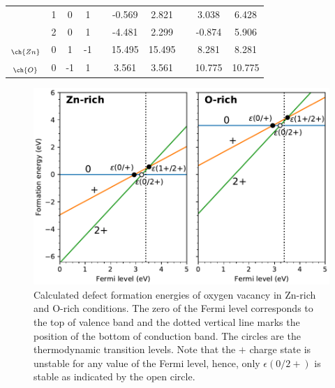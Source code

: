 \begin{table}[tbhp!]
{\begin{tabular}{@{}cccccccccc@{}}
							& 1                  & 0                   & 1                    &  & -0.569         & 2.821          &  & 3.038          & 6.428          \\
							& 2                  & 0                   & 1                    &  & -4.481         & 2.299          &  & -0.874         & 5.906          \\
	\ch{O}$_{\ch{Zn}}$                      & 0                  & 1                   & -1                   &  & 15.495         & 15.495         &  & 8.281          & 8.281          \\
	\ch{Zn}$_{\ch{O}}$                    & 0                  & -1                  & 1                    &  & 3.561          & 3.561          &  & 10.775         & 10.775         \\ \bottomrule
	\end{tabular}%
	}
	\end{table}
\endgroup

\begin{figure}[tbh!]
	\centering
	\includegraphics[width=0.65\linewidth]{"images/rnd/O_vac-formation"}
	\caption[Calculated defect formation energies of oxygen vacancy in Zn-rich and O-rich conditions]{Calculated defect formation energies of oxygen vacancy in Zn-rich and O-rich conditions. The zero of the Fermi level corresponds to the top of valence band and the dotted vertical line marks the position of the bottom of conduction band. The circles are the thermodynamic transition levels. Note that the $+$ charge state is unstable for any value of the Fermi level, hence, only $\epsilon(0/2+)$ is stable as indicated by the open circle. }
	\label{fig:O_vac-form}
\end{figure}

